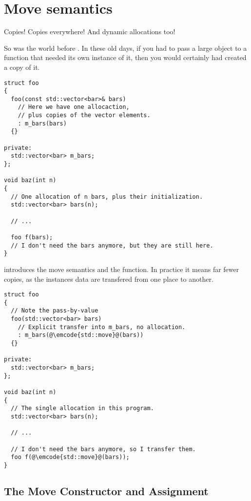 \section{Move semantics}

Copies! Copies everywhere! And dynamic allocations too!

So was the world before . In these old days, if you had to pass
a large object to a function that needed its own instance of it, then
you would certainly had created a copy of it.

\begin{lstlisting}
struct foo
{
  foo(const std::vector<bar>& bars)
    // Here we have one allocaction,
    // plus copies of the vector elements.
    : m_bars(bars)
  {}

private:
  std::vector<bar> m_bars;
};

void baz(int n)
{
  // One allocation of n bars, plus their initialization.
  std::vector<bar> bars(n);
  
  // ...
  
  foo f(bars);
  // I don't need the bars anymore, but they are still here.
}
\end{lstlisting}

 introduces the move semantics and the 
function. In practice it means far fewer copies, as the instances data
are transfered from one place to another.

\begin{lstlisting}
struct foo
{
  // Note the pass-by-value
  foo(std::vector<bar> bars)
    // Explicit transfer into m_bars, no allocation.
    : m_bars(@\emcode{std::move}@(bars))
  {}

private:
  std::vector<bar> m_bars;
};

void baz(int n)
{
  // The single allocation in this program.
  std::vector<bar> bars(n);

  // ...

  // I don't need the bars anymore, so I transfer them.
  foo f(@\emcode{std::move}@(bars));
}
\end{lstlisting}

\subsection{The Move Constructor and Assignment}

